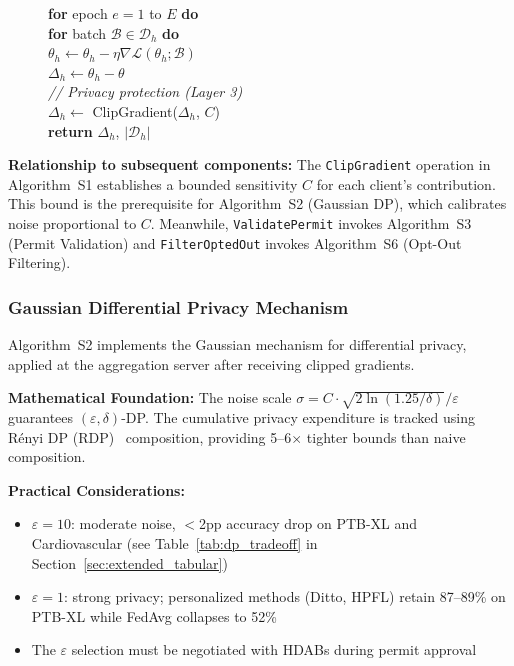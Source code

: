\documentclass[conference]{IEEEtran}
\begin{document}
\begin{figure}[htbp]
{{\hspace*{4mm}\textbf{for} epoch $e = 1$ to $E$ \textbf{do}\\
\hspace*{8mm}\textbf{for} batch $\mathcal{B} \in \mathcal{D}_h$ \textbf{do}\\
\hspace*{12mm}$\theta_h \leftarrow \theta_h - \eta \nabla \mathcal{L}(\theta_h; \mathcal{B})$\\
\hspace*{4mm}$\Delta_h \leftarrow \theta_h - \theta$\\
\hspace*{4mm}\textit{// Privacy protection (Layer 3)}\\
\hspace*{4mm}$\Delta_h \leftarrow$ ClipGradient($\Delta_h$, $C$)\\
\hspace*{4mm}\textbf{return} $\Delta_h$, $|\mathcal{D}_h|$
}}
\end{figure}

\textbf{Relationship to subsequent components:} The \texttt{ClipGradient} operation in Algorithm~S1 establishes a bounded sensitivity $C$ for each client's contribution. This bound is the prerequisite for Algorithm~S2 (Gaussian DP), which calibrates noise proportional to $C$. Meanwhile, \texttt{ValidatePermit} invokes Algorithm~S3 (Permit Validation) and \texttt{FilterOptedOut} invokes Algorithm~S6 (Opt-Out Filtering).

\subsubsection{Gaussian Differential Privacy Mechanism}

Algorithm~S2 implements the Gaussian mechanism for differential privacy, applied at the aggregation server after receiving clipped gradients.

\textbf{Mathematical Foundation:} The noise scale $\sigma = C \cdot \sqrt{2\ln(1.25/\delta)}/\varepsilon$ guarantees $(\varepsilon, \delta)$-DP. The cumulative privacy expenditure is tracked using R\'enyi DP (RDP)~\cite{mironov2017renyi} composition, providing 5--6$\times$ tighter bounds than naive composition.

\textbf{Practical Considerations:}
\begin{itemize}
    \item $\varepsilon = 10$: moderate noise, $<$2pp accuracy drop on PTB-XL and Cardiovascular (see Table~\ref{tab:dp_tradeoff} in Section~\ref{sec:extended_tabular})
    \item $\varepsilon = 1$: strong privacy; personalized methods (Ditto, HPFL) retain 87--89\% on PTB-XL while FedAvg collapses to 52\%
    \item The $\varepsilon$ selection must be negotiated with HDABs during permit approval
\end{itemize}
\end{document}
